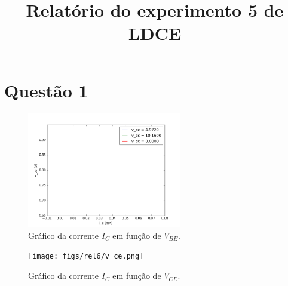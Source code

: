 \documentclass[12pt, a4paper, twoside]{article}
\title{Relatório do experimento 5 de LDCE}
\begin{document}
\maketitle

\section{Questão 1}

\begin{figure}[H]
    \centering
    \includegraphics[width=0.6\textwidth]{figs/rel5/v_be.png}
    \caption{Gráfico da corrente $I_C$ em função de $V_{BE}$.}
\end{figure}

\begin{figure}[H]
    \centering
    \texttt{[image: figs/rel6/v\_ce.png]}
    \caption{Gráfico da corrente $I_C$ em função de $V_{CE}$.}
\end{figure}
\end{document}
